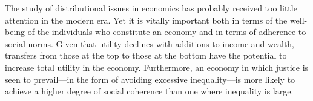 The study of distributional issues in economics has probably received too little attention in the modern era. Yet it is vitally important both in terms of the well-being of the individuals who constitute an economy and in terms of adherence to social norms. Given that utility declines with additions to income and wealth, transfers from those at the top to those at the bottom have the potential to increase total utility in the economy. Furthermore, an economy in which justice is seen to prevail---in the form of avoiding excessive inequality---is more likely to achieve a higher degree of social coherence than one where inequality is large.